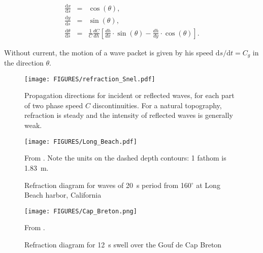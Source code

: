 \begin{eqnarray}
\label{Ray eq}
\frac{\mathrm{d}x}{\mathrm{d}s} &=&\cos \left( \theta \right),  \label{Ray eq 1} \\
\frac{\mathrm{d}y}{\mathrm{d}s} &=&\sin \left( \theta \right),  \label{Ray eq 2} \\
\frac{\mathrm{d}\theta }{\mathrm{d}s} &=&\frac{1}{C}\frac{dC}{dh}\left[ \frac{dh}{dx}\cdot
\sin \left( \theta \right) -\frac{dh}{dy}\cdot \cos \left( \theta \right)
\right].  \label{Ray eq 3}
\end{eqnarray}

Without current, the motion of a wave packet is given by his speed
$\mathrm{d}s/\mathrm{d}t=C_g$ in the direction $\theta$.

\begin{figure}[htb]
\centerline{\texttt{[image: FIGURES/refraction\_Snel.pdf]}}
    \caption{Propagation directions for incident or reflected waves, for each part of two
    phase speed $C$ discontinuities. For a natural topography, refraction is steady and the intensity
    of reflected waves is generally weak.}
\label{fig:Snel}
\end{figure}

\begin{figure}
\centerline{\texttt{[image: FIGURES/Long\_Beach.pdf]}}
  \caption{Refraction diagram for waves of 20~s period from 160$^\circ$ at Long Beach harbor, California}{From \cite{Lacombe1950}. 
  Note the units on the dashed depth contours: 1 fathom is 1.83~m.  }
   \label{RaysLongBeach}
  \end{figure}

\begin{figure}
\centerline{\texttt{[image: FIGURES/Cap\_Breton.png]}}
  \caption{Refraction diagram for 12~s swell over the Gouf de Cap Breton}{From \cite{Lacombe1950}.}  
   \label{RaysCapBreton}
  \end{figure}

